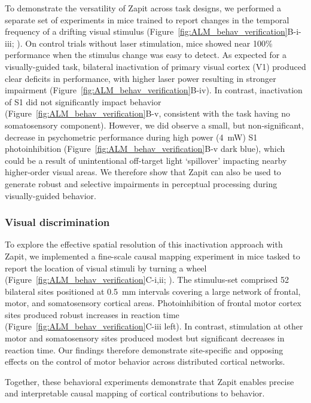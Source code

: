 To demonstrate the versatility of Zapit across task designs, we performed a separate set of experiments in mice trained to report changes in the temporal frequency of a drifting visual stimulus (Figure~\ref{fig:ALM_behav_verification}B-i-iii; \cite{Orsolic2021MesoscaleDecision-making.}).
On control trials without laser stimulation, mice showed near 100\% performance when the stimulus change was easy to detect.
As expected for a visually-guided task, bilateral inactivation of primary visual cortex (V1) produced clear deficits in performance, with higher laser power resulting in stronger impairment (Figure~\ref{fig:ALM_behav_verification}B-iv).
In contrast, inactivation of S1 did not significantly impact behavior (Figure~\ref{fig:ALM_behav_verification}B-v, consistent with the task having no somatosensory component).
However, we did observe a small, but non-significant, decrease in psychometric performance during high power (4~mW) S1 photoinhibition (Figure~\ref{fig:ALM_behav_verification}B-v dark blue), which could be a result of unintentional off-target light ‘spillover’ impacting nearby higher-order visual areas.
We therefore show that Zapit can also be used to generate robust and selective impairments in perceptual processing during visually-guided behavior.

\subsubsection{Visual discrimination}

To explore the effective spatial resolution of this inactivation approach with Zapit, we implemented a fine-scale causal mapping experiment in mice tasked to report the location of visual stimuli by turning a wheel (Figure~\ref{fig:ALM_behav_verification}C-i,ii; \cite{InternationalBrainLaboratory2021StandardizedMice, InternationalBrainLaboratory2025ABehaviour}).
The stimulus-set comprised 52 bilateral sites positioned at 0.5~mm intervals covering a large network of frontal, motor, and somatosensory cortical areas.
Photoinhibition of frontal motor cortex sites produced robust increases in reaction time (Figure~\ref{fig:ALM_behav_verification}C-iii left).
In contrast, stimulation at other motor and somatosensory sites produced modest but significant decreases in reaction time.
Our findings therefore demonstrate site-specific and opposing effects on the control of motor behavior across distributed cortical networks.

Together, these behavioral experiments demonstrate that Zapit enables precise and interpretable causal mapping of cortical contributions to behavior.


